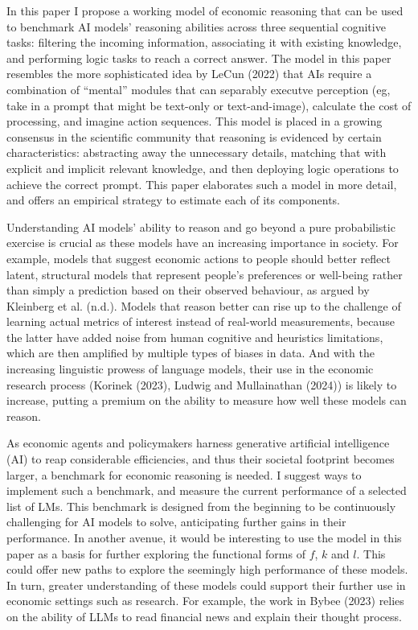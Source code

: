 \documentclass[
]{article}
\begin{document}
In this paper I propose a working model of economic reasoning that can
be used to benchmark AI models' reasoning abilities across three
sequential cognitive tasks: filtering the incoming information,
associating it with existing knowledge, and performing logic tasks to
reach a correct answer. The model in this paper resembles the more
sophisticated idea by LeCun (2022) that AIs require a combination of
``mental'' modules that can separably executve perception (eg, take in a
prompt that might be text-only or text-and-image), calculate the cost of
processing, and imagine action sequences. This model is placed in a
growing consensus in the scientific community that reasoning is
evidenced by certain characteristics: abstracting away the unnecessary
details, matching that with explicit and implicit relevant knowledge,
and then deploying logic operations to achieve the correct prompt. This
paper elaborates such a model in more detail, and offers an empirical
strategy to estimate each of its components.

Understanding AI models' ability to reason and go beyond a pure
probabilistic exercise is crucial as these models have an increasing
importance in society. For example, models that suggest economic actions
to people should better reflect latent, structural models that represent
people's preferences or well-being rather than simply a prediction based
on their observed behaviour, as argued by Kleinberg et al. (n.d.).
Models that reason better can rise up to the challenge of learning
actual metrics of interest instead of real-world measurements, because
the latter have added noise from human cognitive and heuristics
limitations, which are then amplified by multiple types of biases in
data. And with the increasing linguistic prowess of language models,
their use in the economic research process (Korinek (2023), Ludwig and
Mullainathan (2024)) is likely to increase, putting a premium on the
ability to measure how well these models can reason.

As economic agents and policymakers harness generative artificial
intelligence (AI) to reap considerable efficiencies, and thus their
societal footprint becomes larger, a benchmark for economic reasoning is
needed. I suggest ways to implement such a benchmark, and measure the
current performance of a selected list of LMs. This benchmark is
designed from the beginning to be continuously challenging for AI models
to solve, anticipating further gains in their performance. In another
avenue, it would be interesting to use the model in this paper as a
basis for further exploring the functional forms of \(f\), \(k\) and
\(l\). This could offer new paths to explore the seemingly high
performance of these models. In turn, greater understanding of these
models could support their further use in economic settings such as
research. For example, the work in Bybee (2023) relies on the ability of
LLMs to read financial news and explain their thought process.
\end{document}
